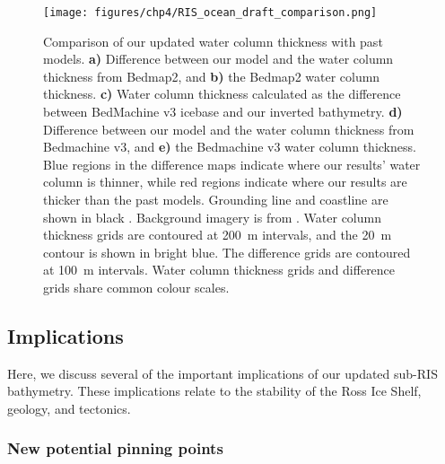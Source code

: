 \begin{figure}[!ht]
    \centering
    \texttt{[image: figures/chp4/RIS\_ocean\_draft\_comparison.png]}
    \caption[Water column thickness comparisons]{Comparison of our updated water column thickness with past models. \textbf{a)} Difference between our model and the water column thickness from Bedmap2, and \textbf{b)} the Bedmap2 water column thickness. \textbf{c)} Water column thickness calculated as the difference between BedMachine v3 icebase and our inverted bathymetry. \textbf{d)} Difference between our model and the water column thickness from Bedmachine v3, and \textbf{e)} the Bedmachine v3 water column thickness. Blue regions in the difference maps indicate where our results' water column is thinner, while red regions indicate where our results are thicker than the past models. Grounding line and coastline are shown in black \citep{morlighemmeasures2022}. Background imagery is from \citet{scambosmodisbased2007}. Water column thickness grids are contoured at 200~m intervals, and the 20~m contour is shown in bright blue. The difference grids are contoured at 100~m intervals. Water column thickness grids and difference grids share common colour scales.}
    \label{fig:chp4_RIS_ocean_draft_comparison}
\end{figure}

\subsection{Implications}

Here, we discuss several of the important implications of our updated sub-RIS bathymetry. These implications relate to the stability of the Ross Ice Shelf, geology, and tectonics. 

\subsubsection{New potential pinning points}

